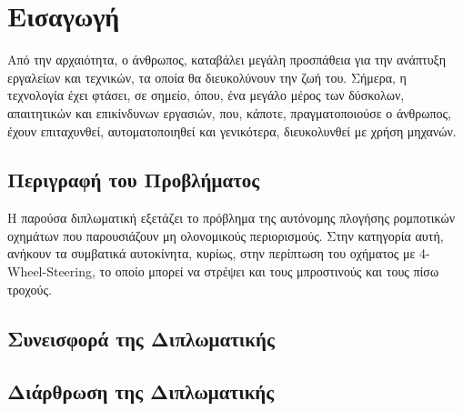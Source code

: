 
\chapter{Εισαγωγή} %

Από την αρχαιότητα, ο άνθρωπος, καταβάλει μεγάλη προσπάθεια για την ανάπτυξη εργαλείων και
τεχνικών, τα οποία θα διευκολύνουν την ζωή του. Σήμερα, η τεχνολογία έχει φτάσει, σε σημείο, όπου, ένα μεγάλο μέρος των δύσκολων, απαιτητικών και επικίνδυνων εργασιών, που, κάποτε, πραγματοποιούσε ο άνθρωπος, έχουν επιταχυνθεί, αυτοματοποιηθεί και γενικότερα, διευκολυνθεί με χρήση μηχανών.

\label{Chapter1} %


\section{Περιγραφή του Προβλήματος}
Η παρούσα διπλωματική εξετάζει το πρόβλημα της αυτόνομης πλογήσης ρομποτικών οχημάτων που παρουσιάζουν μη ολονομικούς περιορισμούς. Στην κατηγορία αυτή, ανήκουν τα συμβατικά
αυτοκίνητα,  κυρίως, στην περίπτωση του οχήματος με 4-Wheel-Steering, το οποίο μπορεί να στρέψει και τους μπροστινούς και τους πίσω τροχούς.


\section{Συνεισφορά της Διπλωματικής}


\section{Διάρθρωση της Διπλωματικής}
